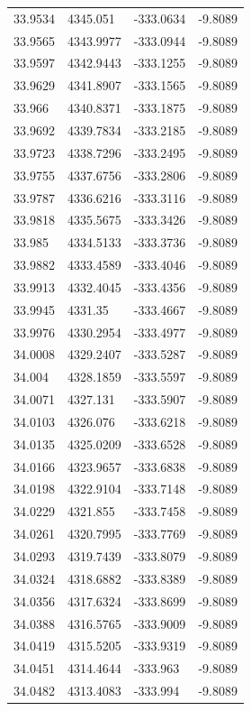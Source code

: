 \begin{table}[H]
\begin{tabular}{llll}
33.9534 & 4345.051 & -333.0634 & -9.8089 \\
33.9565 & 4343.9977 & -333.0944 & -9.8089 \\
33.9597 & 4342.9443 & -333.1255 & -9.8089 \\
33.9629 & 4341.8907 & -333.1565 & -9.8089 \\
33.966 & 4340.8371 & -333.1875 & -9.8089 \\
33.9692 & 4339.7834 & -333.2185 & -9.8089 \\
33.9723 & 4338.7296 & -333.2495 & -9.8089 \\
33.9755 & 4337.6756 & -333.2806 & -9.8089 \\
33.9787 & 4336.6216 & -333.3116 & -9.8089 \\
33.9818 & 4335.5675 & -333.3426 & -9.8089 \\
33.985 & 4334.5133 & -333.3736 & -9.8089 \\
33.9882 & 4333.4589 & -333.4046 & -9.8089 \\
33.9913 & 4332.4045 & -333.4356 & -9.8089 \\
33.9945 & 4331.35 & -333.4667 & -9.8089 \\
33.9976 & 4330.2954 & -333.4977 & -9.8089 \\
34.0008 & 4329.2407 & -333.5287 & -9.8089 \\
34.004 & 4328.1859 & -333.5597 & -9.8089 \\
34.0071 & 4327.131 & -333.5907 & -9.8089 \\
34.0103 & 4326.076 & -333.6218 & -9.8089 \\
34.0135 & 4325.0209 & -333.6528 & -9.8089 \\
34.0166 & 4323.9657 & -333.6838 & -9.8089 \\
34.0198 & 4322.9104 & -333.7148 & -9.8089 \\
34.0229 & 4321.855 & -333.7458 & -9.8089 \\
34.0261 & 4320.7995 & -333.7769 & -9.8089 \\
34.0293 & 4319.7439 & -333.8079 & -9.8089 \\
34.0324 & 4318.6882 & -333.8389 & -9.8089 \\
34.0356 & 4317.6324 & -333.8699 & -9.8089 \\
34.0388 & 4316.5765 & -333.9009 & -9.8089 \\
34.0419 & 4315.5205 & -333.9319 & -9.8089 \\
34.0451 & 4314.4644 & -333.963 & -9.8089 \\
34.0482 & 4313.4083 & -333.994 & -9.8089 \\

\end{tabular}
\end{table}

